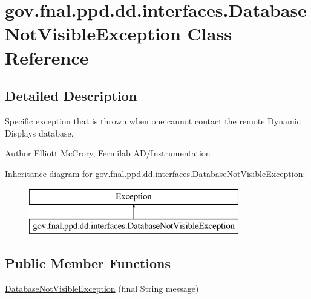 \hypertarget{classgov_1_1fnal_1_1ppd_1_1dd_1_1interfaces_1_1DatabaseNotVisibleException}{\section{gov.\-fnal.\-ppd.\-dd.\-interfaces.\-Database\-Not\-Visible\-Exception Class Reference}
\label{classgov_1_1fnal_1_1ppd_1_1dd_1_1interfaces_1_1DatabaseNotVisibleException}
}


\subsection{Detailed Description}
Specific exception that is thrown when one cannot contact the remote Dynamic Displays database.

\begin{DoxyAuthor}{Author}
Elliott Mc\-Crory, Fermilab A\-D/\-Instrumentation 
\end{DoxyAuthor}
Inheritance diagram for gov.\-fnal.\-ppd.\-dd.\-interfaces.\-Database\-Not\-Visible\-Exception\-:\begin{figure}[H]
\begin{center}
\leavevmode
\includegraphics[height=2.000000cm]{classgov_1_1fnal_1_1ppd_1_1dd_1_1interfaces_1_1DatabaseNotVisibleException}
\end{center}
\end{figure}
\subsection*{Public Member Functions}
\begin{DoxyCompactItemize}
\item 
\hyperlink{classgov_1_1fnal_1_1ppd_1_1dd_1_1interfaces_1_1DatabaseNotVisibleException_a2f8be9e5eadc05bcbb8531a042933fec}{Database\-Not\-Visible\-Exception} (final String message)
\end{DoxyCompactItemize}



